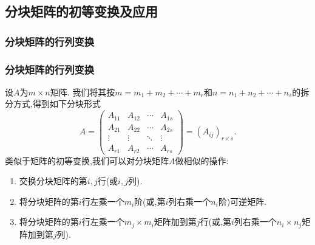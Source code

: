 \begin{frame}
\end{frame}


\subsection{分块矩阵的初等变换及应用}

\subsubsection{分块矩阵的行列变换}
\begin{frame}\frametitle{分块矩阵的行列变换}
设$A$为$m\times n$矩阵. 我们将其按$m=m_1+m_2+\cdots+m_r$和$n=n_1+n_2+\cdots+n_s$的拆分方式,得到如下分块形式
\[ A = \left(\begin{array}{cccc}
A_{11} & A_{12} & \cdots & A_{1 s}\\
A_{21} & A_{22} & \cdots & A_{2 s}\\
\vdots & \vdots & \ddots & \vdots\\
A_{r 1} & A_{r 2} & \cdots & A_{rs}
\end{array}\right) = (A_{ij})_{r \times s}.\]
\pp
类似于矩阵的初等变换,我们可以对分块矩阵$A$做相似的操作:\pp
\begin{enumerate}
\item 交换分块矩阵的第$i,j$行(或$i,j$列). \pp
\item 将分块矩阵的第$i$行左乘一个$m_i$阶(或,第$i$列右乘一个$n_i$阶)可逆矩阵. \pp
\item 将分块矩阵的第$i$行左乘一个$m_j\times m_i$矩阵加到第$j$行(或,第$i$列右乘一个$n_i\times n_j$矩阵加到第$j$列).
\end{enumerate}
\end{frame}





